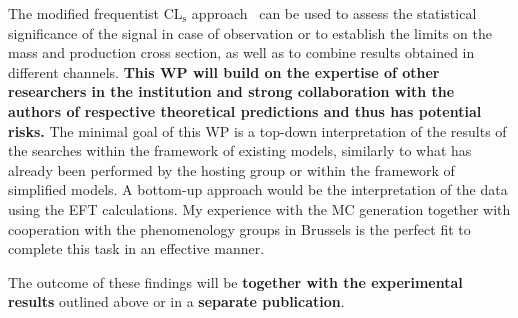 The modified frequentist $\mathrm{CL_s}$ approach~\cite{Junk:1999kv,Read:2002hq} can be used to assess the statistical significance of the signal in case of observation or to establish the limits on the mass and production cross section, as well as to combine results obtained in different channels. \textbf{This WP will build on the expertise of other researchers in the institution and strong collaboration with the authors of respective theoretical predictions and thus has potential risks.} The minimal goal of this WP is a top-down interpretation of the results of the searches within the framework of existing models, similarly to what has already been performed by the hosting group or within the framework of simplified models. A bottom-up approach would be the interpretation of the data using the EFT calculations. My experience with the MC generation together with cooperation with the phenomenology groups in Brussels is the perfect fit to complete this task in an effective manner.

The outcome of these findings will be \textbf{together with the experimental results} outlined above or in a \textbf{separate publication}.